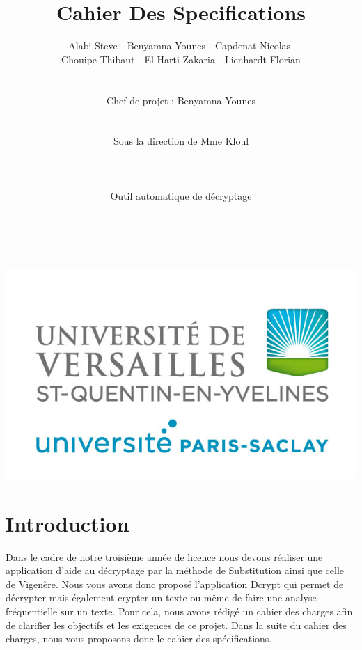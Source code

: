 \documentclass[a4]{article}
\begin{document}
	\title{\Huge{\textbf{Cahier Des Specifications}}}
	\author{Alabi Steve - Benyamna Younes - Capdenat Nicolas- \\
		Chouipe Thibaut - El Harti Zakaria - Lienhardt Florian \\ \\ \\
		Chef de projet : Benyamna Younes \\ \\ \\ 
		Sous la direction de Mme Kloul \\ \\ \\ \\
		Outil automatique de décryptage \\ \\ \\}
		

	\begin{titlepage}
		\maketitle
		\vspace{20em}
		\begin{center}\includegraphics{logo_uvsq.jpg}\end{center}
	\end{titlepage}
	\section{Introduction}
Dans le cadre de notre troisième année de licence nous devons réaliser une application d'aide au
décryptage par la méthode de Substitution ainsi que celle de Vigenère.
Nous vous avons donc proposé l'application Dcrypt qui permet de décrypter 
mais également crypter un texte ou même de faire une analyse fréquentielle sur un texte.
Pour cela, nous avons rédigé un cahier des charges afin de clarifier les objectifs et les 
exigences de ce projet. Dans la suite du cahier des charges, nous vous proposons donc
le cahier des spécifications.\\
\end{document}
